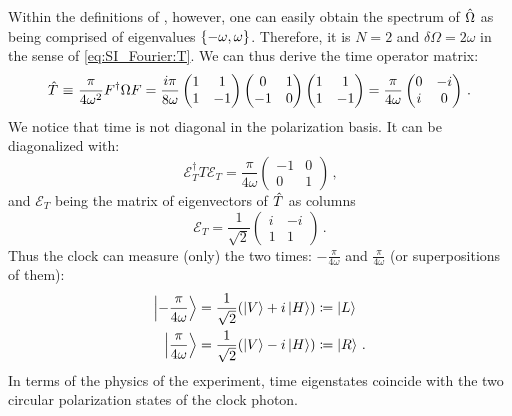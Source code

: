 Within the definitions of \citereset\cite{Moreva:illustration}, however,
one can easily obtain
the spectrum of $\hat{\Omega}$
as being comprised of eigenvalues
$\qty{-\omega, \omega}$.
Therefore, it is $N=2$ and $\delta\Omega = 2\omega$ in the sense of
\eqref{eq:SI_Fourier:T}.
We can thus derive the time operator matrix:
\begin{equation}
  \hat{T}
  \operatorname*{\,\equiv\,}
  \frac{\pi}{4\omega^2} F^{\dagger} \Omega F
  =
  \frac{i\pi}{8\omega}
  \begin{pmatrix}
    1 & 1 \\
    1 & -1
  \end{pmatrix}
  \begin{pmatrix}
    0 & 1 \\
   -1 & 0
  \end{pmatrix}
  \begin{pmatrix}
    1 & 1 \\
    1 & -1
  \end{pmatrix}
  =
  \frac{\pi}{4\omega}
  \begin{pmatrix}
    0 & -i \\
    i &  0
  \end{pmatrix}
  \,\text{.}
\end{equation}
We notice that time is not diagonal in the polarization basis.
It can be diagonalized with:
\begin{equation}\label{eq:moreva_diag_T}
  \mathcal{E}_T^{\dagger} T \mathcal{E}_T
  =
\frac{\pi}{4\omega}
\begin{pmatrix}
  -1  & 0 \\
  0   & 1
\end{pmatrix}
\,\text{,}
\end{equation}
and $\mathcal{E}_T$ being the matrix of eigenvectors of $\hat{T}$ as columns
\begin{equation}
  \mathcal{E}_T
  =
  \frac{1}{\sqrt{2}}
  \begin{pmatrix}
    i & -i \\
    1 & 1
  \end{pmatrix}
  \,\text{.}
\end{equation}
Thus the clock can measure (only) the two times: $-\frac{\pi}{4\omega}$ and $\frac{\pi}{4\omega}$
(or superpositions of them):
\begin{align}
  \ket{-\frac{\pi}{4\omega}} &= \frac{1}{\sqrt{2}} \qty(\ket{V}+i\ket{H}) \coloneqq \ket{L} \\
  \ket{ \frac{\pi}{4\omega}} &= \frac{1}{\sqrt{2}} \qty(\ket{V}-i\ket{H}) \coloneqq \ket{R} \, \text{.}
\end{align}
In terms of the physics of the experiment,
time eigenstates coincide with
the two circular polarization states of the clock photon.

